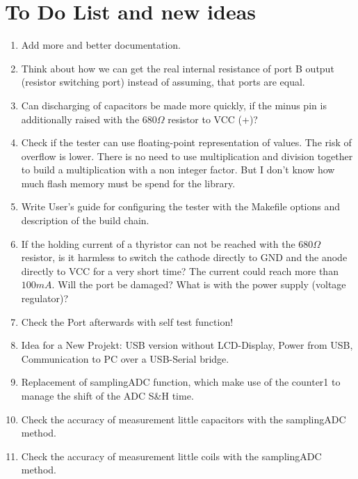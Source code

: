 
\chapter{To Do List and new ideas}
\label{sec:todo}

\begin{enumerate}
\item Add more and better documentation.
\item Think about how we can get the real internal resistance of port B output (resistor switching port) instead of assuming, that ports are equal.
\item Can discharging of capacitors be made more quickly, if the minus pin is additionally raised
with the \(680\Omega\) resistor to VCC (+)?
\item Check if the tester can use floating-point representation of  values. The risk of overflow  is lower.
There is no need to use multiplication and division together to build a multiplication with a non integer factor.
But I don't know how much flash memory must be spend for the library.
\item Write User's guide for configuring the tester with the Makefile options and description of the build chain.
\item If the holding current of a thyristor can not be reached with the \(680\Omega\) resistor, is it harmless to switch the cathode directly to GND
and the anode directly to VCC for a very short time?
The current could reach more than \(100mA\). Will the port be damaged? What is with the power supply (voltage regulator)?
\item Check the Port afterwards with self test function!
\item Idea for a New Projekt: USB  version without LCD-Display, Power from USB, Communication to PC over a USB-Serial bridge.
\item Replacement of samplingADC function, which make use of the counter1 to manage the shift of the ADC S\&H time.
\item Check the accuracy of measurement little capacitors with the samplingADC method.
\item Check the accuracy of measurement little coils with the samplingADC method.

\end{enumerate}

